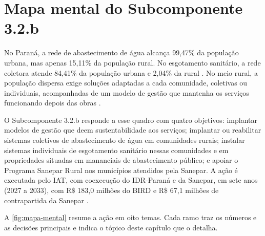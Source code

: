 \FloatBarrier
\section{Mapa mental do Subcomponente 3.2.b}
\label{sec:mapa-mental}

No Paraná, a rede de abastecimento de água alcança 99,47\% da população urbana,
mas apenas 15,11\% da população rural. No esgotamento sanitário, a rede
coletora atende 84,41\% da população urbana e 2,04\% da rural
\cite{sinisa2024}. No meio rural, a população dispersa exige soluções
adaptadas a cada comunidade, coletivas ou individuais, acompanhadas de um
modelo de gestão que mantenha os serviços funcionando depois das obras
\cite{mop2026}.

O Subcomponente 3.2.b responde a esse quadro com quatro objetivos: implantar
modelos de gestão que deem sustentabilidade aos serviços; implantar ou
reabilitar sistemas coletivos de abastecimento de água em comunidades rurais;
instalar sistemas individuais de esgotamento sanitário nessas comunidades e
em propriedades situadas em mananciais de abastecimento público; e apoiar o
Programa Sanepar Rural nos municípios atendidos pela Sanepar. A ação é
executada pelo IAT, com coexecução do IDR-Paraná e da Sanepar, em sete anos
(2027 a 2033), com R\$ 183,0 milhões do BIRD e R\$ 67,1 milhões de
contrapartida da Sanepar \cite{custo2026}.

A \autoref{fig:mapa-mental} resume a ação em oito temas. Cada ramo traz os
números e as decisões principais e indica o tópico deste capítulo que o
detalha.

